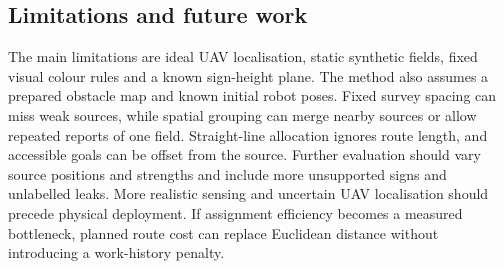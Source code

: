 \documentclass[conference]{IEEEtran}
\begin{document}
\subsection{Limitations and future work}
The main limitations are ideal UAV localisation, static synthetic fields, fixed visual colour rules and a known sign-height plane. The method also assumes a prepared obstacle map and known initial robot poses. Fixed survey spacing can miss weak sources, while spatial grouping can merge nearby sources or allow repeated reports of one field. Straight-line allocation ignores route length, and accessible goals can be offset from the source. Further evaluation should vary source positions and strengths and include more unsupported signs and unlabelled leaks. More realistic sensing and uncertain UAV localisation should precede physical deployment. If assignment efficiency becomes a measured bottleneck, planned route cost can replace Euclidean distance without introducing a work-history penalty.

\newpage


\end{document}
